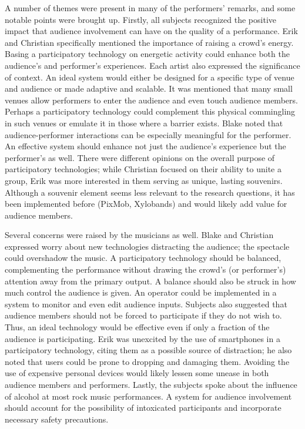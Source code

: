 A number of themes were present in many of the performers' remarks, and some notable points were brought up. Firstly, all subjects recognized the positive impact that audience involvement can have on the quality of a performance. Erik and Christian specifically mentioned the importance of raising a crowd's energy. Basing a participatory technology on energetic activity could enhance both the audience's and performer's experiences. Each artist also expressed the significance of context. An ideal system would either be designed for a specific type of venue and audience or made adaptive and scalable. It was mentioned that many small venues allow performers to enter the audience and even touch audience members. Perhaps a participatory technology could complement this physical commingling in such venues or emulate it in those where a barrier exists. Blake noted that audience-performer interactions can be especially meaningful for the performer. An effective system should enhance not just the audience's experience but the performer's as well. There were different opinions on the overall purpose of participatory technologies; while Christian focused on their ability to unite a group, Erik was more interested in them serving as unique, lasting souvenirs.  Although a souvenir element seems less relevant to the research questions, it has been implemented before (PixMob, Xylobands) and would likely add value for audience members.

Several concerns were raised by the musicians as well. Blake and Christian expressed worry about new technologies distracting the audience; the spectacle could overshadow the music. A participatory technology should be balanced, complementing the performance without drawing the crowd's (or performer's) attention away from the primary output. A balance should also be struck in how much control the audience is given. An operator could be implemented in a system to monitor and even edit audience inputs. Subjects also suggested that audience members should not be forced to participate if they do not wish to. Thus, an ideal technology would be effective even if only a fraction of the audience is participating. Erik was unexcited by the use of smartphones in a participatory technology, citing them as a possible source of distraction; he also noted that users could be prone to dropping and damaging them. Avoiding the use of expensive personal devices would likely lessen some unease in both audience members and performers. Lastly, the subjects spoke about the influence of alcohol at most rock music performances. A system for audience involvement should account for the possibility of intoxicated participants and incorporate necessary safety precautions.

